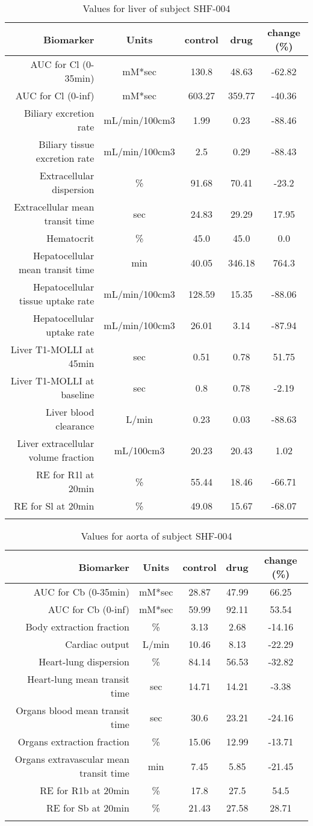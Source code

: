 \documentclass{epflreport}%
\begin{document}
%
\clearpage%
\begin{longtable}{rcccc}%
\hline%
Biomarker&Units&control&drug&change (\%)\\%
\hline%
AUC for Cl (0{-}35min)&mM*sec&130.8&48.63&{-}62.82\\%
AUC for Cl (0{-}inf)&mM*sec&603.27&359.77&{-}40.36\\%
Biliary excretion rate&mL/min/100cm3&1.99&0.23&{-}88.46\\%
Biliary tissue excretion rate&mL/min/100cm3&2.5&0.29&{-}88.43\\%
Extracellular dispersion&\%&91.68&70.41&{-}23.2\\%
Extracellular mean transit time&sec&24.83&29.29&17.95\\%
Hematocrit&\%&45.0&45.0&0.0\\%
Hepatocellular mean transit time&min&40.05&346.18&764.3\\%
Hepatocellular tissue uptake rate&mL/min/100cm3&128.59&15.35&{-}88.06\\%
Hepatocellular uptake rate&mL/min/100cm3&26.01&3.14&{-}87.94\\%
Liver T1{-}MOLLI at 45min&sec&0.51&0.78&51.75\\%
Liver T1{-}MOLLI at baseline&sec&0.8&0.78&{-}2.19\\%
Liver blood clearance&L/min&0.23&0.03&{-}88.63\\%
Liver extracellular volume fraction&mL/100cm3&20.23&20.43&1.02\\%
RE for R1l at 20min&\%&55.44&18.46&{-}66.71\\%
RE for Sl at 20min&\%&49.08&15.67&{-}68.07\\%
\hline%
\caption{Values for liver of subject SHF-004} \\%
\end{longtable}%
\begin{longtable}{rcccc}%
\hline%
Biomarker&Units&control&drug&change (\%)\\%
\hline%
AUC for Cb (0{-}35min)&mM*sec&28.87&47.99&66.25\\%
AUC for Cb (0{-}inf)&mM*sec&59.99&92.11&53.54\\%
Body extraction fraction&\%&3.13&2.68&{-}14.16\\%
Cardiac output&L/min&10.46&8.13&{-}22.29\\%
Heart{-}lung dispersion&\%&84.14&56.53&{-}32.82\\%
Heart{-}lung mean transit time&sec&14.71&14.21&{-}3.38\\%
Organs blood mean transit time&sec&30.6&23.21&{-}24.16\\%
Organs extraction fraction&\%&15.06&12.99&{-}13.71\\%
Organs extravascular mean transit time&min&7.45&5.85&{-}21.45\\%
RE for R1b at 20min&\%&17.8&27.5&54.5\\%
RE for Sb at 20min&\%&21.43&27.58&28.71\\%
\hline%
\caption{Values for aorta of subject SHF-004} \\%
\end{longtable}%
\clearpage%
\end{document}
